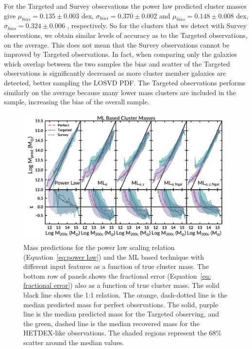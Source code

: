 \documentclass[fleqn,usenatbib]{mnras}
\begin{document}
For the Targeted and Survey observations the power law predicted cluster masses give $\mu_{bias} =0.135\pm{0.003}$ dex, $\sigma_{bias} = 0.370\pm{0.002}$ and $\mu_{bias} =0.148\pm{0.008}$ dex, $\sigma_{bias} = 0.324\pm{0.006}$ , respectively. So for the clusters that we detect with Survey observations, we obtain similar levels of accuracy as to the Targeted observations, on the average. This does not mean that the Survey observations cannot be improved by Targeted observations. In fact, when comparing only the galaxies which overlap between the two samples the bias and scatter of the Targeted observations is significantly decreased as more cluster member galaxies are detected, better sampling the LOSVD PDF. The Targeted observations performs similarly on the average because many lower mass clusters are included in the sample, increasing the bias of the overall sample.

\begin{figure} 
	\includegraphics[width=\textwidth]{figures/MLcomparison.pdf} 
	\caption[ML based cluster mass predictions]{Mass predictions for the power law scaling relation (Equation~\ref{eq:power law}) and the ML based technique with different input features as a function of true cluster mass. The bottom row of panels shows the fractional error (Equation~\ref{eq: fractional error}) also as a function of true cluster mass. The solid black line shows the 1:1 relation. The orange, dash-dotted line is the median predicted mass for perfect observations. The solid, purple line is the median predicted mass for the Targeted observing, and the green, dashed line is the median recovered mass for the HETDEX-like observations. The shaded regions represent the 68\% scatter around the median values.}
	\label{fig: ML comparison} 
\end{figure}
\end{document}
